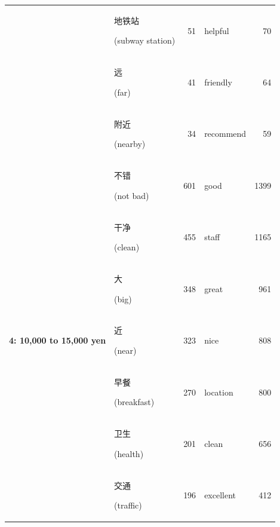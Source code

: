\documentclass[smallextended,natbib]{svjour3}       %
\begin{document}
\begin{table}[ht]
{\begin{tabular}{|c|lr|lr|}
                                                             & \begin{CJK}{UTF8}{gbsn}地铁站\end{CJK} (subway station) & 51    & helpful     & 70    \\  
                                                             & \begin{CJK}{UTF8}{gbsn}远\end{CJK} (far)              & 41    & friendly    & 64    \\  
                                                             & \begin{CJK}{UTF8}{gbsn}附近\end{CJK} (nearby)          & 34    & recommend   & 59    \\ \hline
        \multirow{10}{*}{\textbf{4: 10,000 to 15,000 yen}}   & \begin{CJK}{UTF8}{gbsn}不错\end{CJK} (not bad)         & 601   & good        & 1399  \\  
                                                             & \begin{CJK}{UTF8}{gbsn}干净\end{CJK} (clean)           & 455   & staff       & 1165  \\  
                                                             & \begin{CJK}{UTF8}{gbsn}大\end{CJK} (big)              & 348   & great       & 961   \\  
                                                             & \begin{CJK}{UTF8}{gbsn}近\end{CJK} (near)             & 323   & nice        & 808   \\  
                                                             & \begin{CJK}{UTF8}{gbsn}早餐\end{CJK} (breakfast)       & 270   & location    & 800   \\  
                                                             & \begin{CJK}{UTF8}{gbsn}卫生\end{CJK} (health)          & 201   & clean       & 656   \\  
                                                             & \begin{CJK}{UTF8}{gbsn}交通\end{CJK} (traffic)         & 196   & excellent   & 412   \\  

\end{tabular}}
\end{table}
\end{document}

